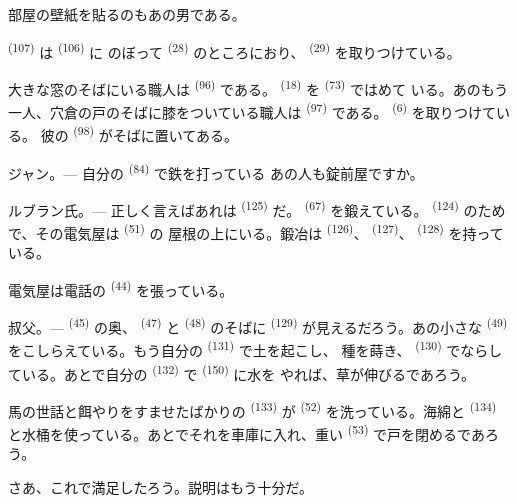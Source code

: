 部屋の壁紙を貼るのもあの男である。

 \textsuperscript{(107)} は \textsuperscript{(106)} に
のぼって \textsuperscript{(28)} のところにおり、
\textsuperscript{(29)} を取りつけている。

大きな窓のそばにいる職人は \textsuperscript{(96)} である。
 \textsuperscript{(18)} を \textsuperscript{(73)} ではめて
いる。あのもう一人、穴倉の戸のそばに膝をついている職人は
\textsuperscript{(97)} である。 \textsuperscript{(6)} を取りつけている。
彼の \textsuperscript{(98)} がそばに置いてある。

\textsc{ジャン}。--- 自分の \textsuperscript{(84)} で鉄を打っている
あの人も錠前屋ですか。

\textsc{ルブラン氏}。--- 正しく言えばあれは \textsuperscript{(125)}
だ。 \textsuperscript{(67)} を鍛えている。
\textsuperscript{(124)} のためで、その電気屋は \textsuperscript{(51)} の
屋根の上にいる。鍛冶は \textsuperscript{(126)}、
\textsuperscript{(127)}、 \textsuperscript{(128)} を持っている。

電気屋は電話の \textsuperscript{(44)} を張っている。

\VUsaut{3.0mm}

\textsc{叔父}。---  \textsuperscript{(45)} の奥、
\textsuperscript{(47)} と \textsuperscript{(48)} のそばに
\textsuperscript{(129)} が見えるだろう。あの小さな \textsuperscript{(49)}
をこしらえている。もう自分の \textsuperscript{(131)} で土を起こし、
種を蒔き、 \textsuperscript{(130)} でならしている。あとで自分の
 \textsuperscript{(132)} で \textsuperscript{(150)} に水を
やれば、草が伸びるであろう。

馬の世話と餌やりをすませたばかりの \textsuperscript{(133)} が
 \textsuperscript{(52)} を洗っている。海綿と
\textsuperscript{(134)} と水桶を使っている。あとでそれを車庫に入れ、重い
 \textsuperscript{(53)} で戸を閉めるであろう。

さあ、これで満足したろう。説明はもう十分だ。

